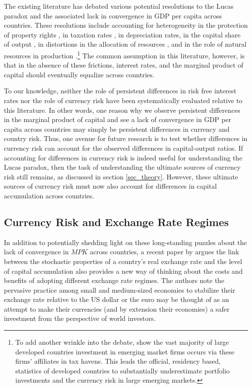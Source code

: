\documentclass{ar-1col}
\begin{document}
The existing literature has debated various potential resolutions to the Lucas paradox and the associated lack in convergence in GDP per capita across countries. These resolutions include accounting for heterogeneity in the protection of property rights \citep{HallJones1997}, in taxation rates \citep{Jorgenson1996}, in depreciation rates, in the capital share of output \citep{Neiman2014}, in distortions in the allocation of resources \citep{HsiehKlenow2009}, and in the role of natural resources in production \citep{CaselliFeyrer2007, Monge-Naranjoetal2019}.\footnote{To add another wrinkle into the debate, \citet{CMNS2020} show the vast majority of large developed countries investment in emerging market firms occurs via these firms’ affiliates in tax havens. This leads the official, residency based, statistics of developed countries to substantially underestimate portfolio investments and the currency risk in large emerging markets.}  The common assumption in this literature, however, is that in the absence of these frictions, interest rates, and the marginal product of capital should eventually equalize across countries.

To our knowledge, neither the role of persistent differences in risk free interest rates nor the role of currency risk have been systematically evaluated relative to this literature. In other words, one reason why we observe persistent differences in the marginal product of capital and see a lack of convergence in GDP per capita across countries may simply be persistent differences in currency and country risk. Thus, one avenue for future research is to test whether differences in currency risk can account for the observed differences in capital-output ratios. If accounting for differences in currency risk is indeed useful for understanding the Lucas paradox, then the task of understanding the ultimate sources of currency risk still remains, as discussed in section \ref{sec_theory}. However, these ultimate sources of currency risk must now also account for differences in capital accumulation across countries. 

\subsection{Currency Risk and Exchange Rate Regimes\label{sec_regimes}}

In addition to potentially shedding light on these long-standing puzzles about the lack of convergence in $MPK$ across countries, a recent paper by \citet{HassanMertensZhang2020} argues the link between the stochastic properties of a country's real exchange rate and the level of capital accumulation also provides a new way of thinking about the costs and benefits of adopting different exchange rate regimes. The authors note the pervasive practice among small and medium-sized economies to stabilize their exchange rate relative to the US dollar or the euro \citep{ilzetzki2018exchange} may be thought of as an attempt to make their currencies (and by extension their economies) a safer investment from the perspective of world investors. 
\end{document}
